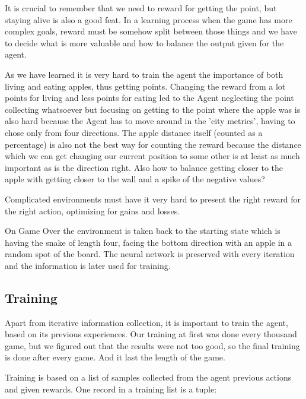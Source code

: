 \documentclass[]{article}
\begin{document}
\par It is crucial to remember that we need to reward for getting the point, but staying alive is also a good feat. In a learning process when the game has more complex goals, reward must be somehow split between those things and we have to decide what is more valuable and how to balance the output given for the agent.

\par As we have learned it is very hard to train the agent the importance of both living and eating apples, thus getting points. Changing the reward from a lot points for living and less points for eating led to the Agent neglecting the point collecting whatsoever but focusing on getting to the point where the apple was is also hard because the Agent has to move around in the 'city metrics', having to chose only from four directions. The apple distance itself (counted as a percentage) is also not the best way for counting the reward because the distance which we can get changing our current position to some other is at least as much important as is the direction right. Also how to balance getting closer to the apple with getting closer to the wall and a spike of the negative values? 

\par Complicated environments must have it very hard to present the right reward for the right action, optimizing for gains and losses. 

\par On Game Over the environment is taken back to the starting state which is having the snake of length four, facing the bottom direction with an apple in a random spot of the board. The neural network is preserved with every iteration and the information is later used for training.

\subsection{Training}

\par Apart from iterative information collection, it is important to train the agent, based on its previous experiences. Our training at first was done every thousand game, but we figured out that the results were not too good, so the final training is done after every game. And it last the length of the game.

\par Training is based on a list of samples collected from the agent previous actions and given rewards. One record in a training list is a tuple: 
\end{document}
